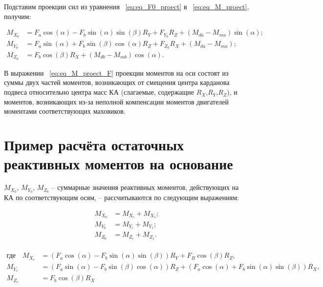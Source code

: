 Подставим проекции сил из уравнения ~\cref{eq:eq_F0_proect} в ~\cref{eq:eq_M_proect}, получим:
\begin{samepage}
	\begin{equation}
		\label{eq:eq_M_proect_F}
		\begin{aligned}
			M_{X_0} &= F_a\cos(\alpha)-F_b\sin(\alpha)\sin(\beta)R_Y+F_{Y_0}R_Z+(M_{da}-M_{ma})\sin(\alpha); \\
			M_{Y_0} &= F_a\sin(\alpha)+F_b\sin(\beta)\cos(\alpha)R_Z+F_{Z_0}R_X+(M_{da}-M_{ma});\\
			M_{Z_0} &= F_b\cos(\beta)R_X+(M_{db}-M_{mb})\cos(\alpha).
		\end{aligned}	
	\end{equation}
\end{samepage}

В выражении ~\cref{eq:eq_M_proect_F} проекции моментов на оси состоят из суммы двух частей моментов, возникающих от смещения центра карданова подвеса относительно центра масс КА (слагаемые, содержащие $R_X$,$R_Y$,$R_Z$), и моментов, возникающих из-за неполной компенсации моментов двигателей моментами соответствующих маховиков. 



\section{Пример расчёта остаточных реактивных моментов на основание}\label{sec:ch2/sec2}

$M_{X_0}$, $M_{Y_0}$, $M_{Z_0}$ – суммарные значения реактивных моментов, действующих на КА по соответствующим осям, – рассчитываются по следующим выражениям:


	\begin{equation}
		\label{eq:eq_M_sum}
		\begin{aligned}
			M_{X_0}&=M_{X_c}+M_{X_1}; \\
			M_{Y_0}&=M_{Y_c}+M_{Y_1}; \\
			M_{Z_0}&=M_{Z_c}+M_{Z_1}. \\
		\end{aligned}	
	\end{equation}
	
	\begin{align*}
		\text{где} \quad
		M_{X_c} &= \left(F_a \cos(\alpha) - F_b \sin(\alpha) \sin(\beta)\right) R_Y + F_B \cos(\beta) R_Z, \\
		M_{Y_c} &= \left(F_a \sin(\alpha) - F_b \sin(\beta) \cos(\alpha)\right) R_Z + \left(F_a \cos(\alpha) + F_b \sin(\alpha) \sin(\beta)\right) R_X, \\
		M_{Z_c} &= F_b \cos(\beta) R_X
	\end{align*}


